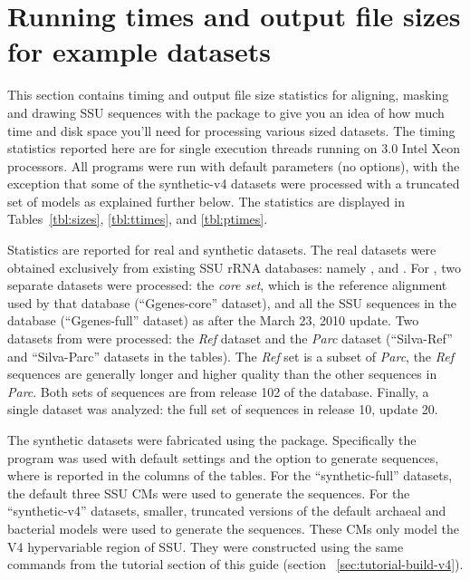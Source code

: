 \section{Running times and output file sizes for example datasets}
\label{sec:stats}

This section contains timing and output file size statistics
for aligning, masking and drawing SSU sequences with the
 package to give you an idea of how much time and disk
space you'll need for processing various sized datasets. The
timing statistics reported here are for single execution threads
running on 3.0 Intel Xeon processors. All programs were run with
default parameters (no options), with the exception that some of the
synthetic-v4 datasets were processed with a truncated set of models as
explained further below. The statistics are displayed in 
Tables~\ref{tbl:sizes}, \ref{tbl:ttimes}, and \ref{tbl:ptimes}.



Statistics are reported for real and synthetic datasets. The real
datasets were obtained exclusively from existing SSU rRNA databases:
namely  \cite{DeSantis06a}, 
\cite{Pruesse07} and  \cite{Cole09}. For ,
two separate datasets were processed: the \emph{core set}, which is the reference
alignment used by that database (``Ggenes-core'' dataset), and all the
SSU sequences in the database (``Ggenes-full'' dataset) as after the
March 23, 2010 update. Two datasets from  were
processed: the \emph{Ref} dataset and the \emph{Parc} dataset
(``Silva-Ref'' and ``Silva-Parc'' datasets in the tables). The
\emph{Ref} set is a subset of \emph{Parc}, the \emph{Ref} sequences
are generally longer and higher quality than the other sequences in
\emph{Parc}. Both sets of sequences are from release 102 of the
database. Finally, a single  dataset was analyzed: the full
set of sequences in release 10, update 20.

The synthetic datasets were fabricated using the 
package. Specifically the  program was used with default
settings and the  option to generate 
sequences, where  is reported in the 
columns of the tables. For the ``synthetic-full'' datasets, the
default three  SSU CMs were used to generate the
sequences. For the ``synthetic-v4'' datasets, smaller, truncated
versions of the default archaeal and bacterial models were used to
generate the sequences. These CMs only model the V4 hypervariable
region of SSU. They were constructed using the same 
commands from the tutorial section of this guide (section
~\ref{sec:tutorial-build-v4}).

